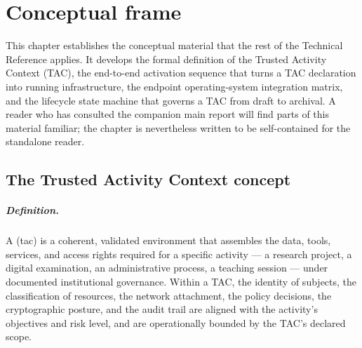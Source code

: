 
\chapter{Conceptual frame}
\label{ch:conceptual-frame}

This chapter establishes the conceptual material that the rest of
the Technical Reference applies. It develops the formal definition
of the Trusted Activity Context (TAC), the end-to-end activation
sequence that turns a TAC declaration into running infrastructure,
the endpoint operating-system integration matrix, and the
lifecycle state machine that governs a TAC from draft to archival.
A reader who has consulted the companion main report will find
parts of this material familiar; the chapter is nevertheless
written to be self-contained for the standalone reader.

\section{The Trusted Activity Context concept}
\label{sec:cf-tac-concept}

\paragraph{Definition.} A 
(\gls{tac}) is a coherent, validated environment that assembles
the data, tools, services, and access rights required for a
specific activity --- a research project, a digital examination,
an administrative process, a teaching session --- under
documented institutional governance. Within a TAC, the
identity of subjects, the classification of resources, the
network attachment, the policy decisions, the cryptographic
posture, and the audit trail are aligned with the activity's
objectives and risk level, and are operationally bounded by the
TAC's declared scope.

